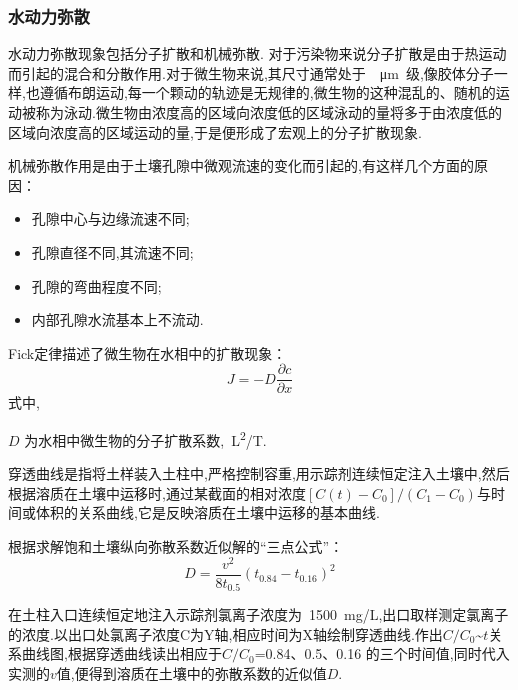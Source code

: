 \subsubsection{水动力弥散}
水动力弥散现象包括分子扩散和机械弥散. 对于污染物来说分子扩散是由于热运动而引起的混合和分散作用.对于微生物来说,其尺寸通常处于~\SI{}{\micro m}~级,像胶体分子一样,也遵循布朗运动,每一个颗动的轨迹是无规律的,微生物的这种混乱的、随机的运动被称为泳动.微生物由浓度高的区域向浓度低的区域泳动的量将多于由浓度低的区域向浓度高的区域运动的量,于是便形成了宏观上的分子扩散现象.\par
机械弥散作用是由于土壤孔隙中微观流速的变化而引起的,有这样几个方面的原因：
\begin{itemize}\setlength{\itemsep}{0em}
\item 孔隙中心与边缘流速不同;
\item 孔隙直径不同,其流速不同;
\item 孔隙的弯曲程度不同;
\item 内部孔隙水流基本上不流动.
\end{itemize}\par
Fick定律描述了微生物在水相中的扩散现象：
\begin{equation}
J=-D\dfrac{\partial c}{\partial x}
\end{equation}
式中,
\begin{paralist}
	\item[$D$]为水相中微生物的分子扩散系数,\SI{}{L^2/T}.
\end{paralist}
穿透曲线是指将土样装入土柱中,严格控制容重,用示踪剂连续恒定注入土壤中,然后根据溶质在土壤中运移时,通过某截面的相对浓度$[C(t)-C_0]/(C_1-C_0)$与时间或体积的关系曲线,它是反映溶质在土壤中运移的基本曲线.\par
根据求解饱和土壤纵向弥散系数近似解的“三点公式”：
\begin{equation}
D=\dfrac{v^2}{8t_{0.5}}(t_{0.84}-t_{0.16})^2
\end{equation}\par
在土柱入口连续恒定地注入示踪剂氯离子浓度为~\SI{1500}{mg/L},出口取样测定氯离子的浓度.以出口处氯离子浓度C为Y轴,相应时间为X轴绘制穿透曲线.作出$C/C_0$\~$t$关系曲线图,根据穿透曲线读出相应于$C/C_0$=0.84、0.5、0.16 的三个时间值,同时代入实测的$v$值,便得到溶质在土壤中的弥散系数的近似值$D$.
